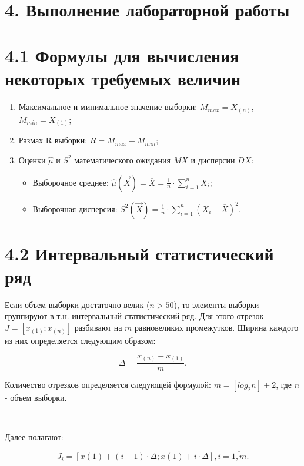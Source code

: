 \documentclass[12pt]{report}
\begin{document}
~\

\clearpage
\section*{4. Выполнение лабораторной работы}

\section*{4.1 Формулы для вычисления некоторых требуемых величин}

\begin{enumerate}
	\item Максимальное и минимальное значение выборки: $M_{max} = X_{(n)}$, $M_{min} = X_{(1)}$;
	\item Размах R выборки: $R = M_{max} - M_{min}$;
	\item Оценки $\hat\mu$ и $S^2$ математического ожидания $MX$ и дисперсии $DX$:
		\begin{itemize}
			\item Выборочное среднее: $\hat\mu(\vec{X}) = \overline X = \frac{1}{n} \cdot \sum\limits_{i=1}^{n} X_i$;
			\item Выборочная дисперсия: $S^2(\vec{X}) = \frac{1}{n} \cdot \sum\limits_{i=1}^{n} (X_i - \overline X)^2$.
		\end{itemize}
\end{enumerate}

\section*{4.2 Интервальный статистический ряд}

Если объем выборки достаточно велик ($n > 50$), то элементы выборки группируют в т.н. интервальный статистический ряд. Для этого отрезок $J = [x_{(1)}; x_{(n)}]$ разбивают на $m$ равновеликих промежутков. Ширина каждого из них определяется следующим образом:

\begin{equation*}
	\Delta = \frac{x_{(n)} - x_{(1)}}{m}.
\end{equation*}

Количество отрезков определяется следующей формулой: $m = [log_2 n] + 2$, где $n$ - объем выборки.

~\

Далее полагают:

\begin{equation*}
	J_i = [x(1) + (i - 1) \cdot \Delta; x(1) + i \cdot \Delta], i = \overline{1, m}.
\end{equation*}
\end{document}
